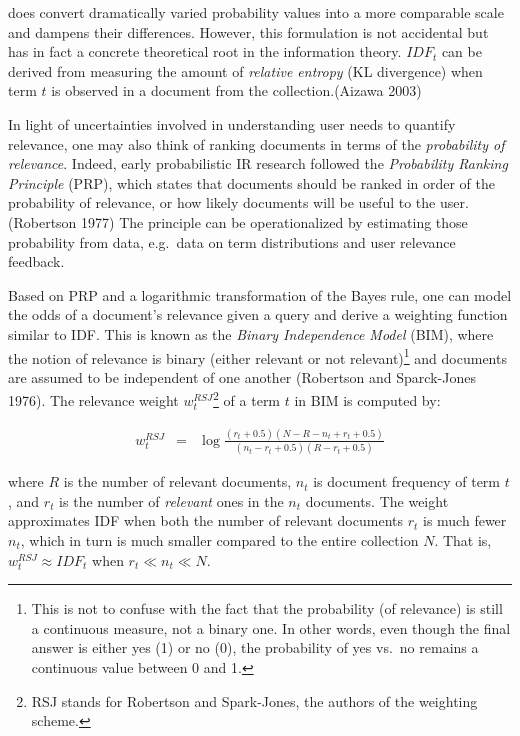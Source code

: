 \documentclass[
  letterpaper,
]{scrbook}
\begin{document}
does convert dramatically varied probability values into a more
comparable scale and dampens their differences. However, this
formulation is not accidental but has in fact a concrete theoretical
root in the information theory. \(IDF_t\) can be derived from measuring
the amount of \emph{relative entropy} (KL divergence) when term \(t\) is
observed in a document from the collection.(Aizawa 2003)

In light of uncertainties involved in understanding user needs to
quantify relevance, one may also think of ranking documents in terms of
the \emph{probability of relevance}. Indeed, early probabilistic IR
research followed the \emph{Probability Ranking Principle} (PRP), which
states that documents should be ranked in order of the probability of
relevance, or how likely documents will be useful to the user.(Robertson
1977) The principle can be operationalized by estimating those
probability from data, e.g.~data on term distributions and user
relevance feedback.

Based on PRP and a logarithmic transformation of the Bayes rule, one can
model the odds of a document's relevance given a query and derive a
weighting function similar to IDF. This is known as the \emph{Binary
Independence Model} (BIM), where the notion of relevance is binary
(either relevant or not relevant)\footnote{This is not to confuse with
  the fact that the probability (of relevance) is still a continuous
  measure, not a binary one. In other words, even though the final
  answer is either yes (1) or no (0), the probability of yes vs.~no
  remains a continuous value between 0 and 1.} and documents are assumed
to be independent of one another (Robertson and Sparck-Jones 1976). The
relevance weight \(w^{RSJ}_t\)\footnote{RSJ stands for Robertson and
  Spark-Jones, the authors of the weighting scheme.} of a term \(t\) in
BIM is computed by:

\[\begin{aligned}
w^{RSJ}_t
& = & \log{\frac{(r_t + 0.5)(N - R - n_t + r_t + 0.5)}{(n_t - r_t + 0.5)(R - r_t + 0.5)}}
\end{aligned}\]

where \(R\) is the number of relevant documents, \(n_t\) is document
frequency of term \(t\), and \(r_t\) is the number of \emph{relevant}
ones in the \(n_t\) documents. The weight approximates IDF when both the
number of relevant documents \(r_t\) is much fewer \(n_t\), which in
turn is much smaller compared to the entire collection \(N\). That is,
\(w^{RSJ}_t \approx IDF_t\) when \(r_t \ll n_t \ll N\).
\end{document}
